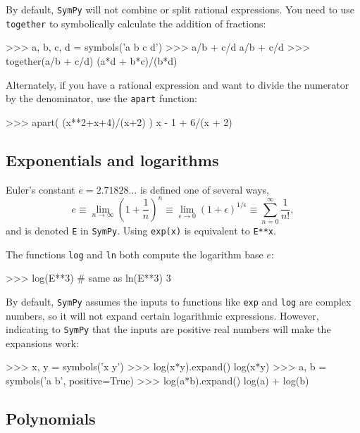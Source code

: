 \noindent
By default, \texttt{SymPy} will not combine or split rational expressions.
You need to use \texttt{together} to symbolically calculate the addition of fractions:

\small
\begin{verbatimtab}
>>> a, b, c, d = symbols('a b c d')
>>> a/b + c/d
a/b + c/d
>>> together(a/b + c/d)
(a*d + b*c)/(b*d)
\end{verbatimtab}
\normalsize

\noindent
Alternately, if you have a rational expression and want to divide the numerator by the denominator,
use the \texttt{apart} function:

\small
\begin{verbatimtab}
>>> apart( (x**2+x+4)/(x+2)  )
x - 1  +  6/(x + 2)
\end{verbatimtab}
\normalsize


\subsection{Exponentials and logarithms}
\label{basics:exponentials_and_logarithms}

Euler's constant $e=2.71828\ldots$ is defined one of several ways,
\[
  e \equiv \lim_{n\to \infty} \left( 1 + \frac{1}{n}\right)^{n}
    \equiv \lim_{\epsilon \to 0} \left( 1 + \epsilon\right)^{1/\epsilon}
    \equiv \sum_{n=0}^\infty \frac{1}{n!},
\]
and is denoted \texttt{E} in \texttt{SymPy}. 
Using \texttt{exp(x)} is equivalent to \texttt{E**x}.

The functions \texttt{log} and \texttt{ln} both compute the logarithm base $e$:

\small
\begin{verbatimtab}
>>> log(E**3)    # same as ln(E**3)
3
\end{verbatimtab}
\normalsize

\noindent
By default, \texttt{SymPy} assumes the inputs to functions like \texttt{exp} and \texttt{log} are complex numbers,
so it will not expand certain logarithmic expressions. 
However, indicating to \texttt{SymPy} that the inputs are positive real numbers will make the expansions work:

\small
\begin{verbatimtab}
>>> x, y = symbols('x y')
>>> log(x*y).expand()
log(x*y)
>>> a, b = symbols('a b', positive=True)
>>> log(a*b).expand()
log(a) + log(b)
\end{verbatimtab}
\normalsize
\subsection{Polynomials}
\label{basics:polynomials}

